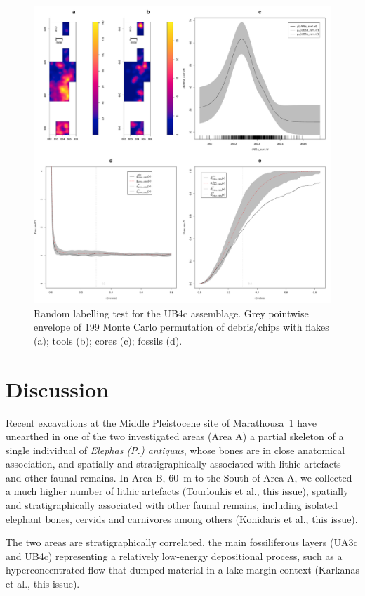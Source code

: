\documentclass[review,authoryear,times]{elsarticle} %
\begin{document}
\begin{figure}[]
  \centering
  \includegraphics[width=1\textwidth]{../artwork/Fig11.pdf}
  \caption{Random labelling test for the UB4c assemblage. Grey pointwise envelope of 199 Monte Carlo permutation of debris/chips with flakes (a); tools (b); cores (c); fossils (d).}
  \label{fig:11}
\end{figure}

\section{Discussion}

Recent excavations at the Middle Pleistocene site of Marathousa~1 have unearthed in one of the two investigated areas (Area A) a partial skeleton of a single individual of \emph{Elephas (P.) antiquus}, whose bones are in close anatomical association, and spatially and stratigraphically associated with lithic artefacts and other faunal remains. In Area B, 60~m to the South of Area A, we collected a much higher number of lithic artefacts (Tourloukis et al., this issue), spatially and stratigraphically associated with other faunal remains, including isolated elephant bones, cervids and carnivores among others (Konidaris et al., this issue).

The two areas are stratigraphically correlated, the main fossiliferous layers (UA3c and UB4c) representing a relatively low-energy depositional process, such as a hyperconcentrated flow that dumped material in a lake margin context (Karkanas et al., this issue).
\end{document}

